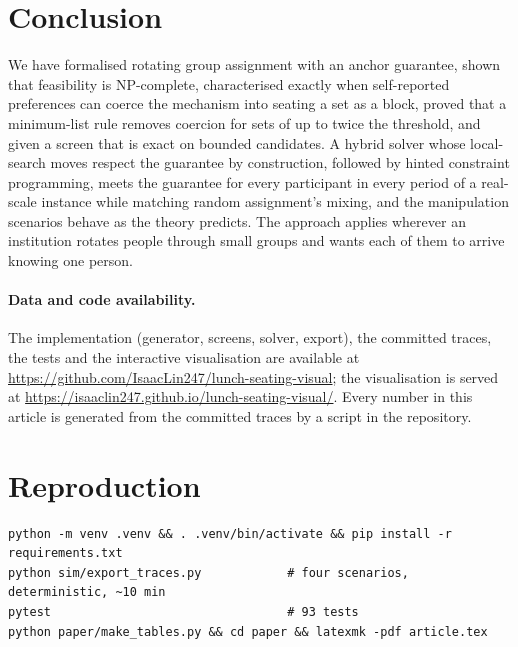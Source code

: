 \documentclass[11pt,a4paper]{article}
\theoremstyle{plain}
\theoremstyle{definition}
\theoremstyle{remark}
\begin{document}
\section{Conclusion}
We have formalised rotating group assignment with an anchor guarantee, shown that feasibility is NP-complete, characterised exactly when self-reported preferences can coerce the mechanism into seating a set as a block, proved that a minimum-list rule removes coercion for sets of up to twice the threshold, and given a screen that is exact on bounded candidates. A hybrid solver whose local-search moves respect the guarantee by construction, followed by hinted constraint programming, meets the guarantee for every participant in every period of a real-scale instance while matching random assignment's mixing, and the manipulation scenarios behave as the theory predicts. The approach applies wherever an institution rotates people through small groups and wants each of them to arrive knowing one person.

\paragraph{Data and code availability.} The implementation (generator, screens, solver, export), the committed traces, the tests and the interactive visualisation are available at \url{https://github.com/IsaacLin247/lunch-seating-visual}; the visualisation is served at \url{https://isaaclin247.github.io/lunch-seating-visual/}. Every number in this article is generated from the committed traces by a script in the repository.




\appendix
\section{Reproduction}
\begin{lstlisting}
python -m venv .venv && . .venv/bin/activate && pip install -r requirements.txt
python sim/export_traces.py            # four scenarios, deterministic, ~10 min
pytest                                 # 93 tests
python paper/make_tables.py && cd paper && latexmk -pdf article.tex
\end{lstlisting}
\end{document}
